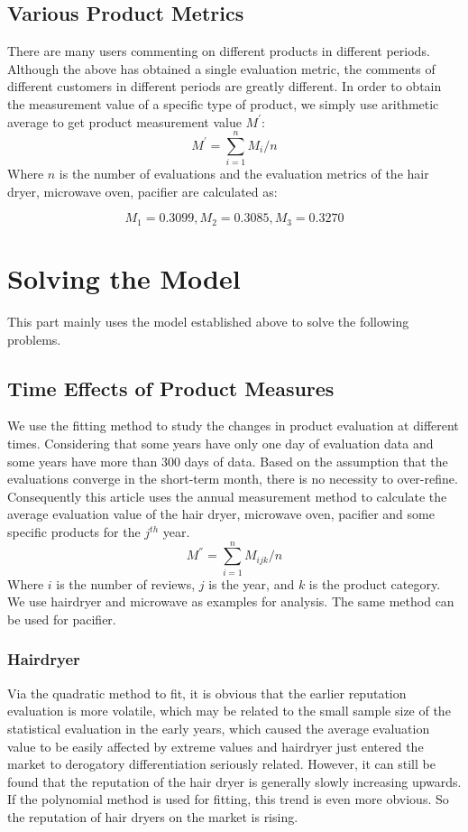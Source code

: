 \documentclass{mcmthesis}
\begin{document}
\subsection{Various Product Metrics}
There are many users commenting on different products in different periods. Although the above has obtained a single evaluation metric, the comments of different customers in different periods are greatly different. In order to obtain the measurement value of a specific type of product, we simply use arithmetic average to get product measurement value $M^{'}$:
\begin{equation}
 M^{'}=\sum_{i=1}^n{M_i}/n 
\end{equation}
Where $n$ is the number of evaluations and the evaluation metrics of the hair dryer, microwave oven, pacifier are calculated as:

$$ M_1=0.3099,M_2=0.3085,M_3=0.3270 $$ 

\section{Solving the Model}
\noindent This part mainly uses the model established above to solve the following problems.
\subsection{Time Effects of Product Measures}
We use the fitting method to study the changes in product evaluation at different times. Considering that some years have only one day of evaluation data and some years have more than 300 days of data. Based on the assumption that the evaluations converge in the short-term month, there is no necessity to over-refine. Consequently this article uses the annual measurement method to calculate the average evaluation value of the hair dryer, microwave oven, pacifier and some specific products for the $j^{th}$ year.
\begin{equation}
M^{''}=\sum_{i=1}^n{M_{ijk}}/n
\end{equation}
Where $i$ is the number of reviews, $j$ is the year, and $k$ is the product category. We use hairdryer and microwave as examples for analysis. The same method can be used for pacifier.

\subsubsection{Hairdryer}
Via the quadratic method to fit, it is obvious that the earlier reputation evaluation is more volatile, which may be related to the small sample size of the statistical evaluation in the early years, which caused the average evaluation value to be easily affected by extreme values and hairdryer  just entered the market to derogatory differentiation seriously related. However, it can still be found that the reputation of the hair dryer is generally slowly increasing upwards. If the polynomial method is used for fitting, this trend is even more obvious. So the reputation of hair dryers on the market is rising.
\end{document}
